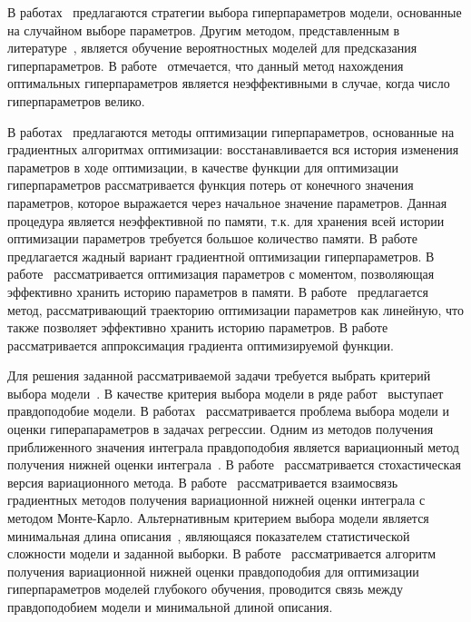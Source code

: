 В работах~\cite{random1, random2} предлагаются стратегии выбора гиперпараметров модели, основанные на случайном выборе параметров. Другим методом, представленным в литературе~\cite{probopt1, probopt2}, является обучение вероятностных моделей для предсказания гиперпараметров. В работе~\cite{hyper} отмечается, что данный метод нахождения оптимальных гиперпараметров является неэффективными в случае, когда число гиперпараметров велико. 

В работах~\cite{hyper, hyper2,  hyper_mad, hyper_hoag, greed_hyper} предлагаются методы оптимизации гиперпараметров, основанные на градиентных алгоритмах оптимизации: восстанавливается вся история изменения параметров в ходе оптимизации, в качестве функции для оптимизации гиперпараметров рассматривается функция потерь от конечного значения параметров, которое выражается через начальное значение параметров. Данная процедура является неэффективной по памяти, т.к. для хранения всей истории оптимизации параметров требуется большое количество памяти. В работе~\cite{greed_hyper} предлагается жадный вариант градиентной оптимизации гиперпараметров. В работе~\cite{hyper} рассматривается оптимизация параметров с моментом, позволяющая эффективно хранить историю параметров в памяти. В работе~\cite{hyper_mad} предлагается метод, рассматривающий траекторию оптимизации параметров как линейную, что также позволяет эффективно хранить историю параметров. В работе~\cite{hyper_hoag} рассматривается аппроксимация градиента оптимизируемой функции. 

Для решения заданной рассматриваемой задачи требуется выбрать критерий выбора модели~\cite{MacKay,Bishop}. 
В качестве критерия выбора модели в ряде работ~\cite{MacKay,Bishop,tokmakova,zaitsev, strijov_dsc} выступает правдоподобие модели. В работах~\cite{tokmakova,zaitsev, strijov_dsc} рассматривается проблема выбора модели и оценки гиперапараметров в задачах регрессии. Одним из методов получения приближенного значения интеграла правдоподобия является вариационный метод получения нижней оценки интеграла~\cite{Bishop}. В работе~\cite{hoffman} рассматривается стохастическая версия вариационного метода.  В работе~\cite{varmc} рассматривается взаимосвязь градиентных методов получения вариационной нижней оценки интеграла с методом Монте-Карло.  Альтернативным критерием выбора модели является минимальная длина описания~\cite{mdl}, являющаяся показателем статистической сложности модели и заданной выборки. В работе~\cite{nips} рассматривается алгоритм получения вариационной нижней оценки правдоподобия  для оптимизации гиперпараметров моделей глубокого обучения, проводится связь между правдоподобием модели и минимальной длиной описания. 

